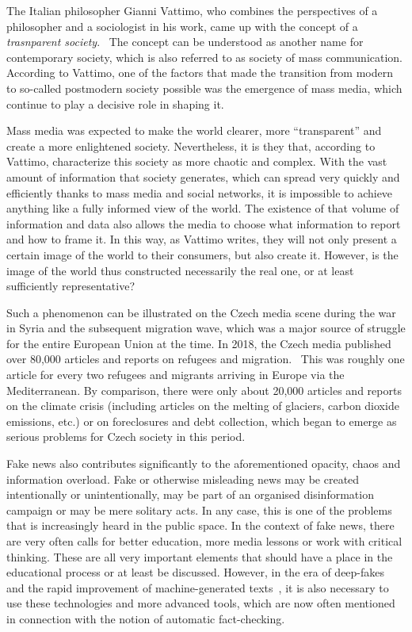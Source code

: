 \begin{introduction}
\label{section:introduction}
    The Italian philosopher Gianni Vattimo, who combines the perspectives of a philosopher and a sociologist in his work, came up with the concept of a \emph{trasnparent society}.~\parencite{vattimo_2013} The concept can be understood as another name for contemporary society, which is also referred to as society of mass communication. According to Vattimo, one of the factors that made the transition from modern to so-called postmodern society possible was the emergence of mass media, which continue to play a decisive role in shaping it. 
    
    Mass media was expected to make the world clearer, more \enquote{transparent} and create a more enlightened society. Nevertheless, it is they that, according to Vattimo, characterize this society as more chaotic and complex. With the vast amount of information that society generates, which can spread very quickly and efficiently thanks to mass media and social networks, it is impossible to achieve anything like a fully informed view of the world. The existence of that volume of information and data also allows the media to choose what information to report and how to frame it. In this way, as Vattimo writes, they will not only present a certain image of the world to their consumers, but also create it. However, is the image of the world thus constructed necessarily the real one, or at least sufficiently representative?
    
    Such a phenomenon can be illustrated on the Czech media scene during the war in Syria and the subsequent migration wave, which was a major source of struggle for the entire European Union at the time. In 2018, the Czech media published over 80,000 articles and reports on refugees and migration.~\parencite{prokop_2020} This was roughly one article for every two refugees and migrants arriving in Europe via the Mediterranean. By comparison, there were only about 20,000 articles and reports on the climate crisis (including articles on the melting of glaciers, carbon dioxide emissions, etc.) or on foreclosures and debt collection, which began to emerge as serious problems for Czech society in this period.~\parencite{prokop_2020}

    Fake news also contributes significantly to the aforementioned opacity, chaos and information overload. Fake or otherwise misleading news may be created intentionally or unintentionally, may be part of an organised disinformation campaign or may be mere solitary acts. In any case, this is one of the problems that is increasingly heard in the public space. In the context of fake news, there are very often calls for better education, more media lessons or work with critical thinking. These are all very important elements that should have a place in the educational process or at least be discussed. However, in the era of deep-fakes and the rapid improvement of machine-generated texts~\parencite{hao_2020}, it is also necessary to use these technologies and more advanced tools, which are now often mentioned in connection with the notion of automatic fact-checking.
    

\end{introduction}

